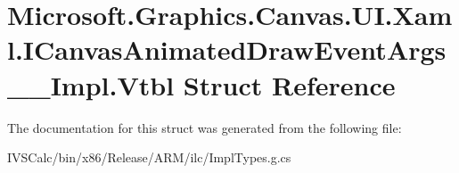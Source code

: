 \hypertarget{struct_microsoft_1_1_graphics_1_1_canvas_1_1_u_i_1_1_xaml_1_1_i_canvas_animated_draw_event_args_____impl_1_1_vtbl}{}\section{Microsoft.\+Graphics.\+Canvas.\+U\+I.\+Xaml.\+I\+Canvas\+Animated\+Draw\+Event\+Args\+\_\+\+\_\+\+Impl.\+Vtbl Struct Reference}
\label{struct_microsoft_1_1_graphics_1_1_canvas_1_1_u_i_1_1_xaml_1_1_i_canvas_animated_draw_event_args_____impl_1_1_vtbl}


The documentation for this struct was generated from the following file\+:\begin{DoxyCompactItemize}
\item 
I\+V\+S\+Calc/bin/x86/\+Release/\+A\+R\+M/ilc/Impl\+Types.\+g.\+cs\end{DoxyCompactItemize}
